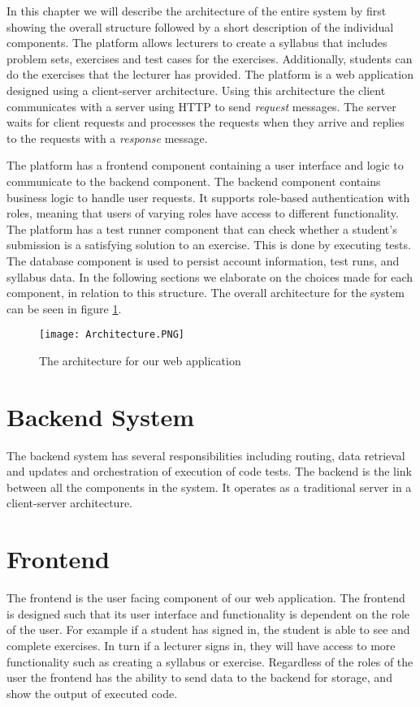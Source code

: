 In this chapter we will describe the architecture of the entire system by first showing the overall structure followed by a short description of the individual components.
The platform allows lecturers to create a syllabus that includes problem sets, exercises and test cases for the exercises. Additionally, students can do the exercises that the lecturer has provided.
The platform is a web application designed using a client-server architecture. Using this architecture the client communicates with a server using HTTP to send \textit{request} messages. The server waits for client requests and processes the requests when they arrive and replies to the requests with a \textit{response} message.

The platform has a frontend component containing a user interface and logic to communicate to the backend component. 
The backend component contains business logic to handle user requests. 
It supports role-based authentication with roles, meaning that users of varying roles have access to different functionality. 
The platform has a test runner component that can check whether a student's submission is a satisfying solution to an exercise. 
This is done by executing tests. The database component is used to persist account information, test runs, and syllabus data.
In the following sections we elaborate on the choices made for each component, in relation to this structure.
The overall architecture for the system can be seen in figure \ref{fig:Architecture}.

\begin{figure}[H]
	\texttt{[image: Architecture.PNG]}
	\centering
	\caption{The architecture for our web application}
	\label{fig:Architecture}
\end{figure}

\section{Backend System}
The backend system has several responsibilities including routing, data retrieval and updates and orchestration of execution of code tests. 
The backend is the link between all the components in the system. It operates as a traditional server in a client-server architecture.

\section{Frontend} \label{sec:architecture-frontend}
The frontend is the user facing component of our web application. The frontend is designed such that its user interface and functionality is dependent on the role of the user.
For example if a student has signed in, the student is able to see and complete exercises. In turn if a lecturer signs in, they will have access to more functionality such as creating a syllabus or exercise.
Regardless of the roles of the user the frontend has the ability to send data to the backend for storage, and show the output of executed code.

